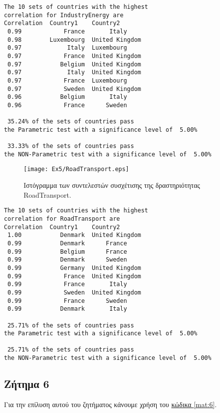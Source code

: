 \documentclass[11pt]{scrartcl} %
\begin{document}
\begin{verbatim}
The 10 sets of countries with the highest 
correlation for IndustryEnergy are
Correlation	 Country1	 Country2
 0.99	 	     France	      Italy 
 0.98	 	 Luxembourg	 United Kingdom 
 0.97	 	      Italy	 Luxembourg 
 0.97	 	     France	 United Kingdom 
 0.97	 	    Belgium	 United Kingdom 
 0.97	 	      Italy	 United Kingdom 
 0.97	 	     France	 Luxembourg 
 0.97	 	     Sweden	 United Kingdom 
 0.96	 	    Belgium	      Italy 
 0.96	 	     France	     Sweden 

 35.24% of the sets of countries pass 
the Parametric test with a significance level of  5.00%

 33.33% of the sets of countries pass 
the NON-Parametric test with a significance level of  5.00%
\end{verbatim}


\begin{figure}[H]
\label{fig:z54} 
	\centering
	\texttt{[image: Ex5/RoadTransport.eps]}	
\caption{Ιστόγραμμα των συντελεστών συσχέτισης της δραστηριότητας RoadTransport.}
\end{figure}



\begin{verbatim}
The 10 sets of countries with the highest 
correlation for RoadTransport are
Correlation	 Country1	 Country2
 1.00	 	    Denmark	 United Kingdom 
 0.99	 	    Denmark	     France 
 0.99	 	    Belgium	     France 
 0.99	 	    Denmark	     Sweden 
 0.99	 	    Germany	 United Kingdom 
 0.99	 	     France	 United Kingdom 
 0.99	 	     France	      Italy 
 0.99	 	     Sweden	 United Kingdom 
 0.99	 	     France	     Sweden 
 0.99	 	    Denmark	      Italy 

 25.71% of the sets of countries pass 
the Parametric test with a significance level of  5.00%

 25.71% of the sets of countries pass 
the NON-Parametric test with a significance level of  5.00%
\end{verbatim}











\subsection{Ζήτημα 6}
\label{subsec:z6}

Για την επίλυση αυτού του ζητήματος κάνουμε χρήση του \hyperref[mat:6]{κώδικα \ref*{mat:6}}.
\end{document}
